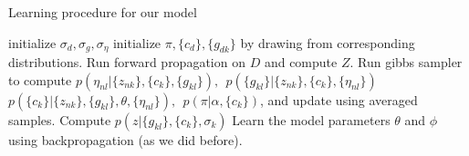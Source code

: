 \begin{algorithm}[t]
\caption{Learning procedure for our model}\label{alg}
\begin{algorithmic}[1]
\STATE initialize $\sigma_d, \sigma_g, \sigma_{\eta}$
\STATE initialize $\pi, \{c_d\}, \{g_{dk}\}$ by drawing from corresponding distributions.
\STATE Run forward propagation on $D$ and compute $Z$.
\STATE Run gibbs sampler to compute $p(\eta_{nl}|\{z_{nk}\}, \{c_k\}, \{g_{kl}\}), ~~p(\{g_{kl}\}|\{z_{nk}\},\{c_k\}, \{\eta_{nl}\})$\\
$p(\{c_k\}|\{z_{nk}\},\{g_{kl}\}, \theta, \{\eta_{nl}\}), ~~p(\pi|\alpha,\{c_k\})$, and update using averaged samples.
\STATE Compute $p(z|\{g_{kl}\},\{c_k\},\sigma_k)$
\STATE Learn the model parameters $\theta$ and $\phi$ using backpropagation (as we did before).
\ENDFOR
\ENDFOR
\end{algorithmic}
\end{algorithm}

\fi
